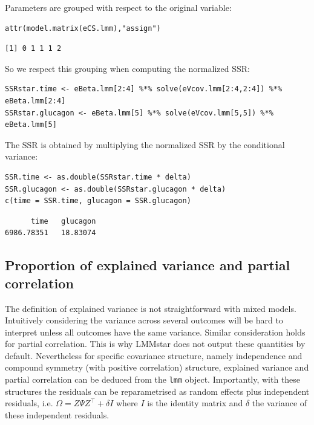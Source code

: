 \documentclass[12pt]{article}
\newcommand\Warning[1][3ex]{%
\renewcommand\stacktype{L}%
\scaleto{\stackon[1.3pt]{\color{red}$\triangle$}{\tiny\bfseries !}}{#1}%
\xspace
}
\newcommand\trans[1]{{#1}^\intercal}%
\begin{document}
Parameters are grouped with respect to the original variable:
\lstset{language=r,label= ,caption= ,captionpos=b,numbers=none}
\begin{lstlisting}
attr(model.matrix(eCS.lmm),"assign")
\end{lstlisting}

\begin{verbatim}
[1] 0 1 1 1 2
\end{verbatim}


\clearpage

So we respect this grouping when computing the normalized SSR: 
\lstset{language=r,label= ,caption= ,captionpos=b,numbers=none}
\begin{lstlisting}
SSRstar.time <- eBeta.lmm[2:4] %*% solve(eVcov.lmm[2:4,2:4]) %*% eBeta.lmm[2:4] 
SSRstar.glucagon <- eBeta.lmm[5] %*% solve(eVcov.lmm[5,5]) %*% eBeta.lmm[5] 
\end{lstlisting}
The SSR is obtained by multiplying the normalized SSR by the
conditional variance:
\lstset{language=r,label= ,caption= ,captionpos=b,numbers=none}
\begin{lstlisting}
SSR.time <- as.double(SSRstar.time * delta)
SSR.glucagon <- as.double(SSRstar.glucagon * delta)
c(time = SSR.time, glucagon = SSR.glucagon)
\end{lstlisting}
\begin{verbatim}
      time   glucagon 
6986.78351   18.83074
\end{verbatim}

\subsection{Proportion of explained variance and partial correlation}
\label{sec:org3874964}

\Warning The definition of explained variance is not straightforward
with mixed models. Intuitively considering the variance across several
outcomes will be hard to interpret unless all outcomes have the same
variance. Similar consideration holds for partial correlation. This
is why LMMstar does not output these quantities by
default. Nevertheless for specific covariance structure, namely
independence and compound symmetry (with positive correlation)
structure, explained variance and partial correlation can be deduced
from the \texttt{lmm} object. Importantly, with these structures the
residuals can be reparametrised as random effects plus independent
residuals, i.e. \(\Omega = Z \Psi \trans{Z} + \delta I\) where
\(I\) is the identity matrix and \(\delta\) the variance of these
independent residuals.
\end{document}
